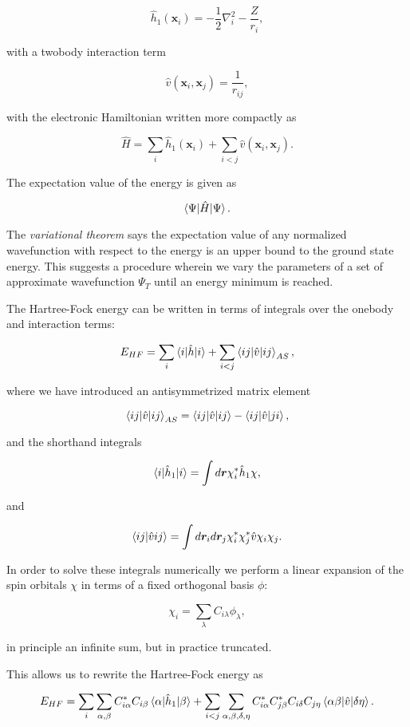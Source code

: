 $$ \hat{h}_1(\bm{x}_i) = -\frac{1}{2} \nabla_i^2
    -\frac{Z}{r_i} , $$

with a twobody interaction term

$$ \hat{v}(\bm{x}_i, \bm{x}_j) = \frac{1}{r_{ij}} , $$

with the electronic Hamiltonian written more compactly as

$$ \hat{H} = \sum_i \hat{h}_1(\bm{x}_i)
    + \sum_{i < j} \hat{v}(\bm{x}_i, \bm{x}_j) .$$

The expectation value of the energy is given as

$$ \braket{\Psi | \hat{H} | \Psi} .$$

The \textit{variational theorem} says the expectation
value of any normalized wavefunction with respect to the energy
is an upper bound to the ground state energy.
This suggests a procedure wherein we vary the parameters
of a set of approximate wavefunction $\Psi_T$
until an energy minimum is reached.
\par
The Hartree-Fock energy can be written in terms of integrals
over the onebody and interaction terms:

$$ E_{HF} = \sum_i \braket{i | \hat{h} | i}
    + \sum_{i < j} \braket{ij | \hat{v} | ij}_{AS} ,$$

where we have introduced an antisymmetrized matrix element

$$ \braket{ij | \hat{v} | ij}_{AS}
    = \braket{ij | \hat{v} | ij} - \braket{ij | \hat{v} | ji} , $$

and the shorthand integrals

$$ \braket{i | \hat{h}_1 | i} =
    \int d\bm{r} \chi_i^* \hat{h}_1 \chi , $$

and

$$ \braket{ij | \hat{v} ij} =
    \int d\bm{r}_i d\bm{r}_j \chi_i^* \chi_j^* \hat{v}
    \chi_i \chi_j . $$

In order to solve these integrals numerically
we perform a linear expansion of the spin orbitals
$\chi$ in terms of a fixed orthogonal basis $\phi$:

$$ \chi_i = \sum_{\lambda} C_{i\lambda} \phi_{\lambda} , $$

in principle an infinite sum, but in practice truncated.
\par
This allows us to rewrite the Hartree-Fock energy as

$$ E_{HF} = \sum_i \sum_{\alpha, \beta}
    C_{i \alpha}^* C_{i\beta} \braket{\alpha | \hat{h}_1 | \beta}
    + \sum_{i < j} \sum_{\alpha, \beta, \delta, \eta}
    C_{i\alpha}^* C_{j\beta}^* C_{i\delta} C_{j\eta}
    \braket{\alpha \beta | \hat{v} | \delta \eta} .$$

